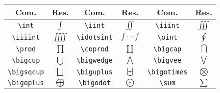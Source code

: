 % 
% 
% 
% 
% 
\begin{tabular}{cc|cc|cc}
    \hline
    Com. & Res. & Com. & Res. & Com. & Res. \\ \hline
    \lstinline!\int! & $\int$ & \lstinline!\iint! & $\iint$ & \lstinline!\iiint! & $\iiint$ \\
    \lstinline!\iiiint! & $\iiiint$ & \lstinline!\idotsint! & $\idotsint$ & \lstinline!\oint! & $\oint$ \\
    \lstinline!\prod! & $\prod$ & \lstinline!\coprod! & $\coprod$ & \lstinline!\bigcap! & $\bigcap$ \\
    \lstinline!\bigcup! & $\bigcup$ & \lstinline!\bigwedge! & $\bigwedge$ & \lstinline!\bigvee! & $\bigvee$ \\ 
    \lstinline!\bigsqcup! & $\bigsqcup$ & \lstinline!\biguplus! & $\biguplus$ & \lstinline!\bigotimes! & $\bigotimes$ \\
    \lstinline!\bigoplus! & $\bigoplus$ & \lstinline!\bigodot! & $\bigodot$ & \lstinline!\sum! & $\sum$ \\ \hline
\end{tabular}
